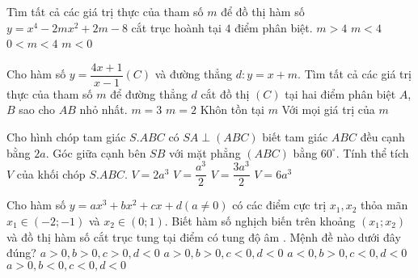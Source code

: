 \begin{ex}%
	Tìm tất cả các giá trị thực của tham số $m$ để đồ thị hàm số $y=x^4-2mx^2+2m-8$ cắt trục hoành tại $4$ điểm phân biệt.
	\choice
	{\True $m>4$}
	{$m<4$}
	{$0<m<4$}
	{$m<0$}
\end{ex}
\begin{ex}%
	Cho hàm số $y=\dfrac{4x+1}{x-1} (C)$ và đường thẳng $d: y=x+m$. Tìm tất cả các giá trị thực của tham số $m$ để đường thẳng $d$ cắt đồ thị $(C)$ tại hai điểm phân biệt $A$, $B$ sao cho $AB$ nhỏ nhất.
	\choice
	{\True $m=3$}
	{$m=2$}
	{Khôn tồn tại $m$}
	{Với mọi giá trị của $m$}
\end{ex}
\begin{ex}%
	Cho hình chóp tam giác $S.ABC$ có $SA\perp (ABC)$ biết tam giác $ABC$ đều cạnh bằng $2a$. Góc giữa cạnh bên $SB$ với mặt phẳng $(ABC)$ bằng $60^\circ$. Tính thể tích $V$ của 
	khối chóp $S.ABC.$
	\choice
	{\True $V=2a^3$}
	{$V=\dfrac{a^3}{2}$}
	{$V=\dfrac{3a^3}{2}$}
	{$V=6a^3$}
\end{ex}
\begin{ex}%
	Cho hàm số $y=ax^3+bx^2+cx+d (a\neq 0)$ có các điểm cực trị $x_1, x_2$ thỏa mãn $x_1\in (-2;-1)$ và $x_2\in (0;1)$. Biết hàm số nghịch biến trên khoảng $(x_1;x_2)$ và đồ thị hàm số cắt trục tung tại điểm có tung độ âm
	. Mệnh đề nào dưới đây đúng?
	\choice
	{$a>0, b>0, c>0, d<0$}
	{\True $a>0, b>0, c<0, d<0$}
	{$a<0, b>0, c<0, d<0$}
	{$a>0, b<0, c<0, d<0$}
\end{ex}
